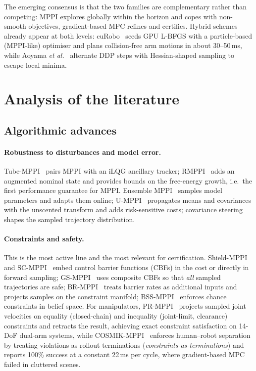 The emerging consensus is that the two families are complementary rather than competing: MPPI explores globally within the horizon and copes with non-smooth objectives, gradient-based MPC refines and certifies. Hybrid schemes already appear at both levels: cuRobo~\cite{sundaralingam2023curobo} seeds GPU L-BFGS with a particle-based (MPPI-like) optimiser and plans collision-free arm motions in about 30--50\,ms, while Aoyama \emph{et al.}~\cite{aoyama2026hybrid} alternate DDP steps with Hessian-shaped sampling to escape local minima.

\section{Analysis of the literature}\label{sec:lit}
\subsection{Algorithmic advances}
\paragraph{Robustness to disturbances and model error.} Tube-MPPI~\cite{williams2018tubemppi} pairs MPPI with an iLQG ancillary tracker; RMPPI~\cite{gandhi2021rmppi} adds an augmented nominal state and provides bounds on the free-energy growth, i.e.\ the first performance guarantee for MPPI. Ensemble MPPI~\cite{abraham2020emppi} samples model parameters and adapts them online; U-MPPI~\cite{mohamed2025umppi} propagates means and covariances with the unscented transform and adds risk-sensitive costs; covariance steering~\cite{yin2022covsteering} shapes the sampled trajectory distribution.

\paragraph{Constraints and safety.} This is the most active line and the most relevant for certification. Shield-MPPI~\cite{yin2023shieldmppi} and SC-MPPI~\cite{gandhi2023safeis} embed control barrier functions (CBFs) in the cost or directly in forward sampling; GS-MPPI~\cite{rabiee2025gsmppi} uses composite CBFs so that \emph{all} sampled trajectories are safe; BR-MPPI~\cite{parwana2025brmppi} treats barrier rates as additional inputs and projects samples on the constraint manifold; BSS-MPPI~\cite{yin2024ccmppi} enforces chance constraints in belief space. For manipulators, PR-MPPI~\cite{lee2026prmppi} projects sampled joint velocities on equality (closed-chain) and inequality (joint-limit, clearance) constraints and retracts the result, achieving exact constraint satisfaction on 14-DoF dual-arm systems, while COSMIK-MPPI~\cite{gursoy2026cosmik} enforces human--robot separation by treating violations as rollout terminations (\emph{constraints-as-terminations}) and reports 100\% success at a constant 22\,ms per cycle, where gradient-based MPC failed in cluttered scenes.

